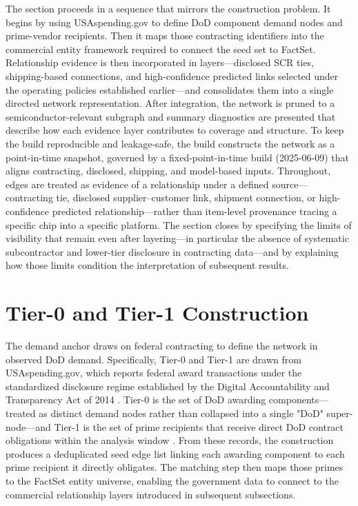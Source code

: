The section proceeds in a sequence that mirrors the construction problem. It begins by using USAspending.gov to define DoD component demand nodes and prime-vendor recipients. Then it maps those contracting identifiers into the commercial entity framework required to connect the seed set to FactSet. Relationship evidence is then incorporated in layers---disclosed SCR ties, shipping-based connections, and high-confidence predicted links selected under the operating policies established earlier---and consolidates them into a single directed network representation. After integration, the network is pruned to a semiconductor-relevant subgraph and summary diagnostics are presented that describe how each evidence layer contributes to coverage and structure. To keep the build reproducible and leakage-safe, the build constructs the network as a point-in-time snapshot, governed by a fixed-point-in-time build (2025-06-09) that aligns contracting, disclosed, shipping, and model-based inputs. Throughout, edges are treated as evidence of a relationship under a defined source---contracting tie, disclosed supplier--customer link, shipment connection, or high-confidence predicted relationship---rather than item-level provenance tracing a specific chip into a specific platform. The section closes by specifying the limits of visibility that remain even after layering---in particular the absence of systematic subcontractor and lower-tier disclosure in contracting data---and by explaining how those limits condition the interpretation of subsequent results.

\section{Tier-0 and Tier-1 Construction}

The demand anchor draws on federal contracting to define the network in observed DoD demand. Specifically, Tier-0 and Tier-1 are drawn from USAspending.gov, which reports federal award transactions under the standardized disclosure regime established by the Digital Accountability and Transparency Act of 2014 \parencite{us_congress_digital_2014}. Tier-0 is the set of DoD awarding components---treated as distinct demand nodes rather than collapsed into a single "DoD" super-node---and Tier-1 is the set of prime recipients that receive direct DoD contract obligations within the analysis window \parencite{us_department_of_the_treasury_data_2025}. From these records, the construction produces a deduplicated seed edge list linking each awarding component to each prime recipient it directly obligates. The matching step then maps those primes to the FactSet entity universe, enabling the government data to connect to the commercial relationship layers introduced in subsequent subsections.

